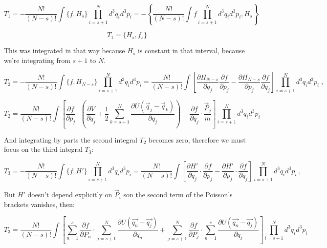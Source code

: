 \documentclass[spanish,notitlepage,letterpaper,11pt]{article} %
\numberwithin{equation}{subsection}
\begin{document}
    \begin{equation*}
        T_1 = -\frac{N!}{(N-s)!}\int\{f,H_s\}\prod_{i=s+1}^Nd^3q_id^3p_i = -\left\{\frac{N!}{(N-s)!}\int f\prod_{i=s+1}^Nd^3q_id^3p_i  , H_s\right\}
    \end{equation*}

    \begin{equation}\label{eq:T1}
        T_1 = \{H_s,f_s\}
    \end{equation}

    This was integrated in that way because $H_s$ is constant in that interval, because we're integrating from $s+1$ to $N$.

    \begin{equation*}
        T_2 = - \frac{N!}{(N-s)!}\int\{f,H_{N-s}\}\prod_{i=s+1}^Nd^3q_id^3p_i = \frac{N!}{(N-s)!}\int\left[\frac{\partial H_{N-s}}{\partial q_j}\frac{\partial f}{\partial p_j} - \frac{\partial H_{N-s}}{\partial p_j}\frac{\partial f}{\partial q_j} \right]\prod_{i=s+1}^Nd^3q_id^3p_i\;,
    \end{equation*}

    \begin{equation*}
        T_2 = \frac{N!}{(N-s)!}\int\left[\frac{\partial f}{\partial p_j} \cdot \left(\frac{\partial V}{\partial q_j} + \frac{1}{2}\sum_{k=s+1}^N\frac{\partial U(\Vec{q}_j - \Vec{q}_k)}{\partial q_j} \right) - \frac{\partial f}{\partial q_j}\cdot \frac{\Vec{P}_j}{m}\right]\prod_{i=s+1}^Nd^3q_id^3p_i
    \end{equation*}

    And integrating by parts the second integral $T_2$ becomes zero, therefore we must focus on the third integral $T_3$:

    \begin{equation*}
        T_3 = - \frac{N!}{(N-s)!}\int\{f,H'\}\prod_{i=s+1}^Nd^3q_id^3p_i = \frac{N!}{(N-s)!}\int\left[\frac{\partial H'}{\partial q_j}\cdot\frac{\partial f}{\partial p_j} - \frac{\partial H'}{\partial p_j}\cdot\frac{\partial f}{\partial q_j}\right]\prod_{i=s+1}^Nd^3q_id^3p_i\;,
    \end{equation*}

    But $H'$ doesn't depend explicitly on $\Vec{P}_i$ son the second term of the Poisson's brackets vanishes, then:

    \begin{equation*}
        T_3 = \frac{N!}{(N-s)!}\int\left[\sum_{n=1}^s \frac{\partial f}{\partial P_n}\cdot \sum_{j = s+1}^N \frac{\partial U(\Vec{q_n} - \Vec{q_j})}{\partial q_n} + \sum_{j=s+1}^N\frac{\partial f}{\partial P_j}\cdot \sum_{n=1}^s\frac{\partial U(\Vec{q_n}-\Vec{q_j})}{\partial q_j} \right]\prod_{i=s+1}^Nd^3q_id^3p_i
    \end{equation*}
\end{document}
